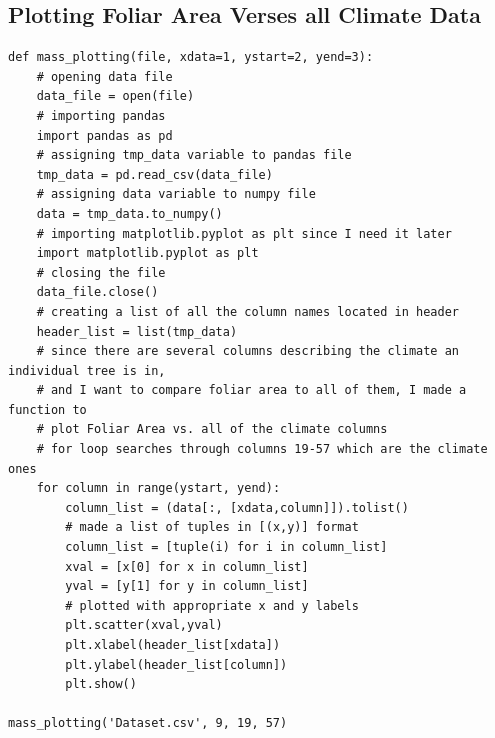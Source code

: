 \documentclass[letterpaper]{article}
\begin{document}
\subsection{Plotting Foliar Area Verses all Climate Data}
\begin{verbatim}
def mass_plotting(file, xdata=1, ystart=2, yend=3):
    # opening data file
    data_file = open(file)
    # importing pandas
    import pandas as pd
    # assigning tmp_data variable to pandas file
    tmp_data = pd.read_csv(data_file)
    # assigning data variable to numpy file
    data = tmp_data.to_numpy()
    # importing matplotlib.pyplot as plt since I need it later
    import matplotlib.pyplot as plt
    # closing the file
    data_file.close()   
    # creating a list of all the column names located in header
    header_list = list(tmp_data)
    # since there are several columns describing the climate an individual tree is in,
    # and I want to compare foliar area to all of them, I made a function to 
    # plot Foliar Area vs. all of the climate columns
    # for loop searches through columns 19-57 which are the climate ones
    for column in range(ystart, yend):
        column_list = (data[:, [xdata,column]]).tolist()
        # made a list of tuples in [(x,y)] format
        column_list = [tuple(i) for i in column_list]
        xval = [x[0] for x in column_list]
        yval = [y[1] for y in column_list]
        # plotted with appropriate x and y labels
        plt.scatter(xval,yval)
        plt.xlabel(header_list[xdata])
        plt.ylabel(header_list[column])
        plt.show()

mass_plotting('Dataset.csv', 9, 19, 57)
\end{verbatim}
\end{document}
